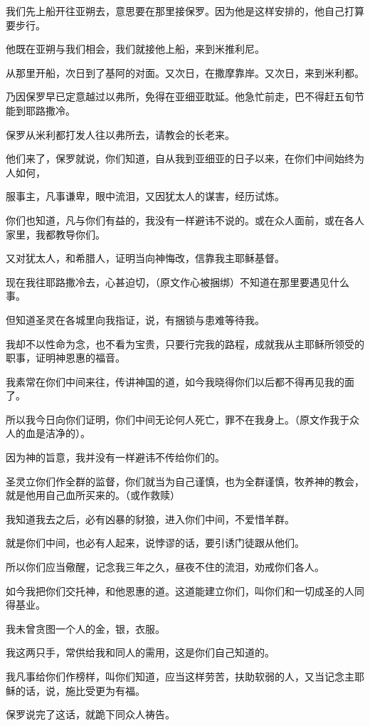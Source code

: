 \documentclass[12pt,oneside]{book}
\begin{document}
我们先上船开往亚朔去，意思要在那里接保罗。因为他是这样安排的，他自己打算要步行。

他既在亚朔与我们相会，我们就接他上船，来到米推利尼。

从那里开船，次日到了基阿的对面。又次日，在撒摩靠岸。又次日，来到米利都。

乃因保罗早已定意越过以弗所，免得在亚细亚耽延。他急忙前走，巴不得赶五旬节能到耶路撒冷。

保罗从米利都打发人往以弗所去，请教会的长老来。

他们来了，保罗就说，你们知道，自从我到亚细亚的日子以来，在你们中间始终为人如何，

服事主，凡事谦卑，眼中流泪，又因犹太人的谋害，经历试炼。

你们也知道，凡与你们有益的，我没有一样避讳不说的。或在众人面前，或在各人家里，我都教导你们。

又对犹太人，和希腊人，证明当向神悔改，信靠我主耶稣基督。

现在我往耶路撒冷去，心甚迫切，（原文作心被捆绑）不知道在那里要遇见什么事。

但知道圣灵在各城里向我指证，说，有捆锁与患难等待我。

我却不以性命为念，也不看为宝贵，只要行完我的路程，成就我从主耶稣所领受的职事，证明神恩惠的福音。

我素常在你们中间来往，传讲神国的道，如今我晓得你们以后都不得再见我的面了。

所以我今日向你们证明，你们中间无论何人死亡，罪不在我身上。（原文作我于众人的血是洁净的）。

因为神的旨意，我并没有一样避讳不传给你们的。

圣灵立你们作全群的监督，你们就当为自己谨慎，也为全群谨慎，牧养神的教会，就是他用自己血所买来的。（或作救赎）

我知道我去之后，必有凶暴的豺狼，进入你们中间，不爱惜羊群。

就是你们中间，也必有人起来，说悖谬的话，要引诱门徒跟从他们。

所以你们应当儆醒，记念我三年之久，昼夜不住的流泪，劝戒你们各人。

如今我把你们交托神，和他恩惠的道。这道能建立你们，叫你们和一切成圣的人同得基业。

我未曾贪图一个人的金，银，衣服。

我这两只手，常供给我和同人的需用，这是你们自己知道的。

我凡事给你们作榜样，叫你们知道，应当这样劳苦，扶助软弱的人，又当记念主耶稣的话，说，施比受更为有福。

保罗说完了这话，就跪下同众人祷告。
\end{document}
